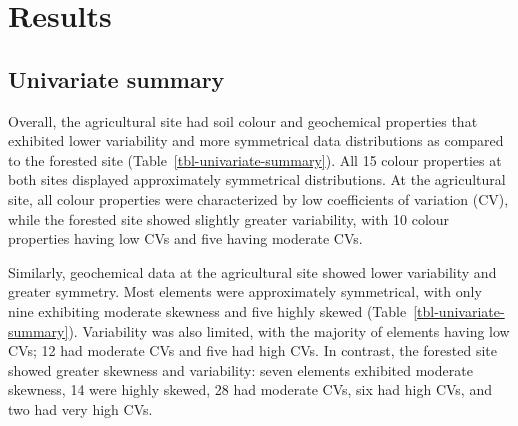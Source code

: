 \documentclass[
  number]{elsarticle}
\begin{document}
\section{Results}\label{results}

\subsection{Univariate summary}\label{univariate-summary}

Overall, the agricultural site had soil colour and geochemical
properties that exhibited lower variability and more symmetrical data
distributions as compared to the forested site
(Table~\ref{tbl-univariate-summary}). All 15 colour properties at both
sites displayed approximately symmetrical distributions. At the
agricultural site, all colour properties were characterized by low
coefficients of variation (CV), while the forested site showed slightly
greater variability, with 10 colour properties having low CVs and five
having moderate CVs.

Similarly, geochemical data at the agricultural site showed lower
variability and greater symmetry. Most elements were approximately
symmetrical, with only nine exhibiting moderate skewness and five highly
skewed (Table~\ref{tbl-univariate-summary}). Variability was also
limited, with the majority of elements having low CVs; 12 had moderate
CVs and five had high CVs. In contrast, the forested site showed greater
skewness and variability: seven elements exhibited moderate skewness, 14
were highly skewed, 28 had moderate CVs, six had high CVs, and two had
very high CVs.
\end{document}
